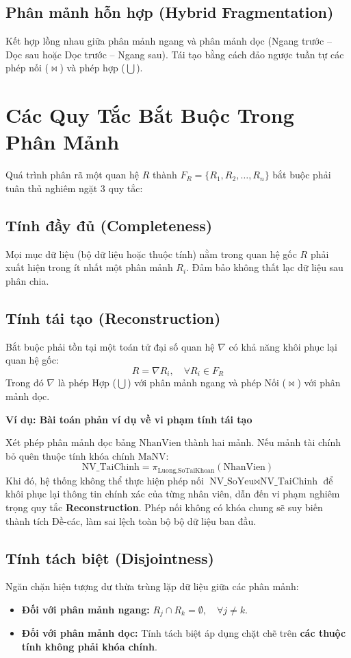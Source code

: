\documentclass[12pt,a4paper]{report}
\newenvironment{viduBox}[1]{%
    \par\vspace{6pt}\noindent
    \begin{minipage}{\textwidth}
    \begin{mdframed}[style=viduStyle]%
    \noindent\textbf{\color{myblue}Ví dụ: #1}\par\vspace{4pt}\small
}{%
    \end{mdframed}%
    \end{minipage}\par\vspace{6pt}
}
\begin{document}
\subsection{Phân mảnh hỗn hợp (Hybrid Fragmentation)}
Kết hợp lồng nhau giữa phân mảnh ngang và phân mảnh dọc (Ngang trước -- Dọc sau hoặc Dọc trước -- Ngang sau). Tái tạo bằng cách đảo ngược tuần tự các phép nối ($\bowtie$) và phép hợp ($\bigcup$).

\section{Các Quy Tắc Bắt Buộc Trong Phân Mảnh}
Quá trình phân rã một quan hệ $R$ thành $F_R = \{R_1, R_2, \dots, R_n\}$ bắt buộc phải tuân thủ nghiêm ngặt 3 quy tắc:

\subsection{Tính đầy đủ (Completeness)}
Mọi mục dữ liệu (bộ dữ liệu hoặc thuộc tính) nằm trong quan hệ gốc $R$ phải xuất hiện trong ít nhất một phân mảnh $R_i$. Đảm bảo không thất lạc dữ liệu sau phân chia.

\subsection{Tính tái tạo (Reconstruction)}
Bắt buộc phải tồn tại một toán tử đại số quan hệ $\nabla$ có khả năng khôi phục lại quan hệ gốc:
\[
    R = \nabla R_i, \quad \forall R_i \in F_R
\]
Trong đó $\nabla$ là phép Hợp ($\bigcup$) với phân mảnh ngang và phép Nối ($\bowtie$) với phân mảnh dọc.

\begin{viduBox}{Bài toán phản ví dụ về vi phạm tính tái tạo}
Xét phép phân mảnh dọc bảng $\text{NhanVien}$ thành hai mảnh. Nếu mảnh tài chính bỏ quên thuộc tính khóa chính $\text{MaNV}$:
\[
    \text{NV\_TaiChinh} = \pi_{\text{Luong}, \text{SoTaiKhoan}}(\text{NhanVien})
\]
Khi đó, hệ thống không thể thực hiện phép nối $\text{NV\_SoYeu} \bowtie \text{NV\_TaiChinh}$ để khôi phục lại thông tin chính xác của từng nhân viên, dẫn đến vi phạm nghiêm trọng quy tắc \textbf{Reconstruction}. Phép nối không có khóa chung sẽ suy biến thành tích Đề-các, làm sai lệch toàn bộ bộ dữ liệu ban đầu.
\end{viduBox}

\subsection{Tính tách biệt (Disjointness)}
Ngăn chặn hiện tượng dư thừa trùng lặp dữ liệu giữa các phân mảnh:
\begin{itemize}
    \item \textbf{Đối với phân mảnh ngang:} $R_j \cap R_k = \emptyset, \quad \forall j \neq k$.
    \item \textbf{Đối với phân mảnh dọc:} Tính tách biệt áp dụng chặt chẽ trên \textbf{các thuộc tính không phải khóa chính}.
\end{itemize}
\end{document}

